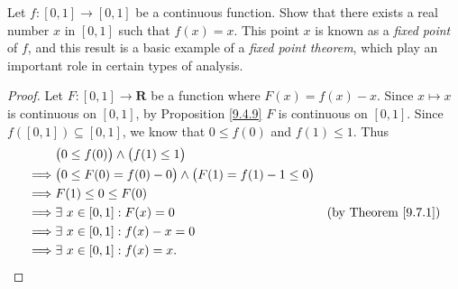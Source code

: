 \begin{exercise}\label{ex 9.7.2}
    Let \(f : [0, 1] \to [0, 1]\) be a continuous function.
    Show that there exists a real number \(x\) in \([0, 1]\) such that \(f(x) = x\).
    This point \(x\) is known as a \emph{fixed point} of \(f\), and this result is a basic example of a \emph{fixed point theorem}, which play an important role in certain types of analysis.
\end{exercise}

\begin{proof}
    Let \(F : [0, 1] \to \mathbf{R}\) be a function where \(F(x) = f(x) - x\).
    Since \(x \mapsto x\) is continuous on \([0, 1]\), by Proposition \ref{9.4.9} \(F\) is continuous on \([0, 1]\).
    Since \(f([0, 1]) \subseteq [0, 1]\), we know that \(0 \leq f(0)\) and \(f(1) \leq 1\).
    Thus
    \begin{align*}
                 & \big(0 \leq f(0)\big) \land \big(f(1) \leq 1\big)                                                         \\
        \implies & \big(0 \leq F(0) = f(0) - 0\big) \land \big(F(1) = f(1) - 1 \leq 0\big)                                   \\
        \implies & F(1) \leq 0 \leq F(0)                                                                                     \\
        \implies & \exists\ x \in [0, 1] : F(x) = 0                                        & \text{(by Theorem \ref{9.7.1})} \\
        \implies & \exists\ x \in [0, 1] : f(x) - x = 0                                                                      \\
        \implies & \exists\ x \in [0, 1] : f(x) = x.
    \end{align*}
\end{proof}